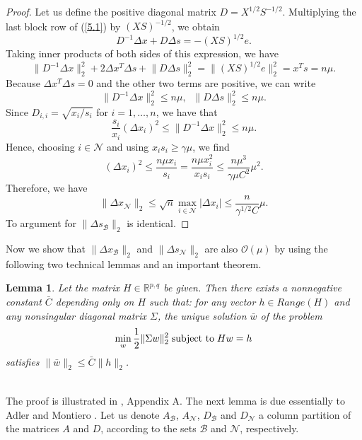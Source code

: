 \documentclass[a4paper,10 pt,titlepage,twoside]{report}
\theoremstyle{plain}
\newtheorem{lem}[thm]{Lemma}
\theoremstyle{definition}
\theoremstyle{remark}
\begin{document}
\begin{proof}
	Let us define the positive diagonal matrix $D = X^{1/2}S^{-1/2}$. Multiplying the last block row of (\ref{5.1}) by $(XS)^{-1/2}$, we obtain 
	\begin{equation*}
	D^{-1}\Delta x + D \Delta s = -(XS)^{1/2}e.
	\end{equation*}
	Taking inner products of both sides of this expression, we have
	\begin{equation*}
	\lVert D^{-1}\Delta x \rVert^{2}_{2} + 2\Delta x^{T}\Delta s+ \lVert D\Delta s \rVert^{2}_{2}= \lVert(XS)^{1/2}e\rVert^{2}_{2}= x^{T}s= n\mu.
	\end{equation*}
	Because $\Delta x^{T}\Delta s= 0$ and the other two terms are positive, we can write
	\begin{equation*}
	\lVert D^{-1}\Delta x\rVert^{2}_{2}\leq n\mu, \;\;\lVert D\Delta s\rVert^{2}_{2}\leq n\mu.
	\end{equation*}
	Since $D_{i,i}= \sqrt{x_{i}/s_{i}}$ for $i=1,\dots,n$, we have that
	\begin{equation*}
	\frac{s_{i}}{x_{i}}(\Delta x_{i})^{2}\leq\lVert D^{-1}\Delta x\rVert^{2}_{2}\leq n\mu.
	\end{equation*}
	Hence, choosing $i\in\mathcal{N}$ and using $x_{i}s_{i}\geq\gamma\mu$, we find
	\begin{equation*}
	(\Delta x_{i})^{2}\leq\frac{n\mu x_{i}}{s_{i}}=\frac{n\mu x_{i}^{2}}{x_{i}s_{i}}\leq\frac{n\mu^{3}}{\gamma\mu C^{2}}\mu^{2}.
	\end{equation*}
	Therefore, we have 
	\begin{equation*}
	\lVert \Delta x_{\mathcal{N}}\rVert_{2} \leq \sqrt{n}\max\limits_{i \in \mathcal{N}}|\Delta x_{i}|\leq\frac{n}{\gamma^{1/2}C}\mu.
	\end{equation*}
	To argument for $\lVert \Delta s_{\mathcal{B}}\rVert_{2}$ is identical.
\end{proof}
Now we show that $\lVert \Delta x_{\mathcal{B}}\rVert_{2}$ and $\lVert \Delta s_{\mathcal{N}}\rVert_{2}$ are also $\mathcal{O}(\mu)$ by using the following two technical lemmas and an important theorem.
\begin{lem} \label{(T)}
	Let the matrix $H\in\mathbb{R}^{p,q}$ be given. Then there exists a nonnegative constant $\bar{C}$ depending only on $H$ such that: for any vector $h\in Range(H)$ and any nonsingular diagonal matrix $\Sigma$, the unique solution $\bar{w}$ of the problem
	\begin{align*}
	\min\limits_{w}\frac{1}{2}\lVert\Sigma w\rVert^{2}_{2} \text{\;subject to\;} Hw = h
	\end{align*}
	satisfies $\lVert\bar{w}\rVert_{2}\leq \bar{C}\lVert h\rVert_{2}$.
\end{lem}\\
The proof is illustrated in \cite{Wright}, Appendix A.
The next lemma is due essentially to Adler and Montiero \cite{ADL}.  Let us denote $A_{\mathcal{B}}$, $A_{\mathcal{N}}$, $D_{\mathcal{B}}$ and $D_{\mathcal{N}}$ a column partition of the matrices $A$ and $D$, according to the sets $\mathcal{B}$ and $\mathcal{N}$, respectively.
\end{document}
